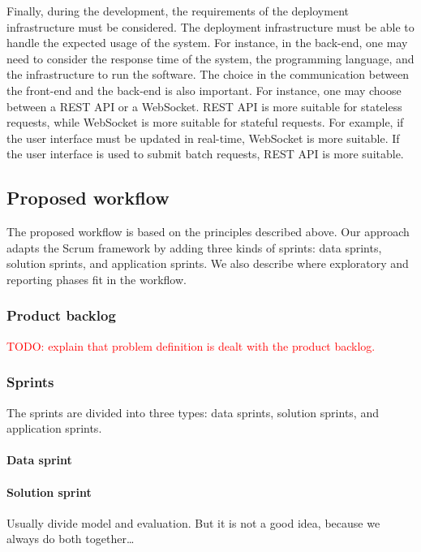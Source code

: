 Finally, during the development, the requirements of the deployment infrastructure must be
considered.  The deployment infrastructure must be able to handle the expected usage
of the system.  For instance, in the back-end, one may need to consider the response time
of the system, the programming language, and the infrastructure to run the software.
The choice in the communication between the front-end and the back-end is also important.
For instance, one may choose between a REST API or a WebSocket.  REST API is more suitable
for stateless requests, while WebSocket is more suitable for stateful requests.  For
example, if the user interface must be updated in real-time, WebSocket is more suitable.
If the user interface is used to submit batch requests, REST API is more suitable.

\subsection{Proposed workflow}

The proposed workflow is based on the principles described above.  Our approach adapts
the Scrum framework by adding three kinds of sprints: data sprints, solution sprints, and
application sprints.  We also describe where exploratory and reporting phases fit in the
workflow.

\subsubsection{Product backlog}

\textcolor{red}{TODO: explain that problem definition is dealt
with the product backlog.}

\subsubsection{Sprints}

The sprints are divided into three types: data sprints, solution sprints, and application
sprints.

\paragraph{Data sprint}

\paragraph{Solution sprint}  Usually divide model and evaluation. But it is not a good
idea, because we always do both together\dots

